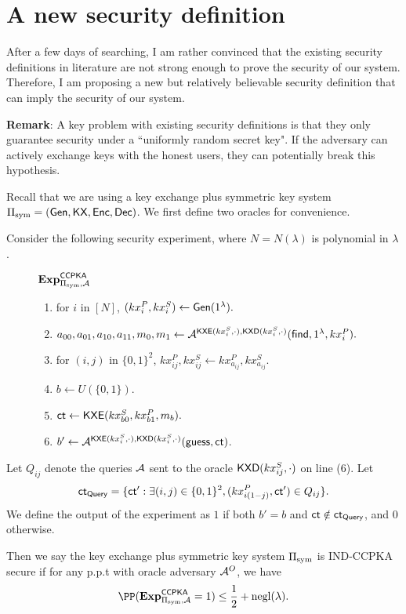 \clearpage
\section{A new security definition}
After a few days of searching, I am rather convinced that the existing security definitions in literature are not strong enough to prove the security of our system. Therefore, I am proposing a new but relatively believable security definition that can imply the security of our system.

\textbf{Remark}: A key problem with existing security definitions is that they only guarantee security under a ``uniformly random secret key". If the adversary can actively exchange keys with the honest users, they can potentially break this hypothesis.

Recall that we are using a key exchange plus symmetric key system $\Pi_{\text{sym}} = (\mathsf{Gen}, \mathsf{KX}, \mathsf{Enc}, \mathsf{Dec})$. We first define two oracles for convenience.

\begin{definition}
\label{defn:CCPKA}
Consider the following security experiment, where $N = N(\lambda)$ is polynomial in $\lambda$.
\begin{figure}[h!]
\begin{framed}
$\mathbf{Exp}^{\mathsf{CCPKA}}_{\Pi_{\text{sym}}, \mathcal{A}}$
\begin{enumerate}
    \item for $i$ in $[N]$, $(kx_{i}^P, kx_{i}^S) \leftarrow \mathsf{Gen}(1^{\lambda}).$
    \item $a_{00}, a_{01}, a_{10}, a_{11}, m_0, m_1 \leftarrow \mathcal{A}^{\mathsf{KXE}(kx_{i}^S, \cdot), \mathsf{KXD}(kx_{i}^S, \cdot)}(\mathsf{find}, 1^{\lambda}, kx_{i}^P).$
    \item for $(i, j)$ in $\{0, 1\}^2$, $kx^{P}_{ij}, kx^S_{ij} \leftarrow kx^P_{a_{ij}}, kx^S_{a_{ij}}$. 
    \item $b \leftarrow U(\{0, 1\})$.
    \item $\mathsf{ct} \leftarrow \mathsf{KXE}(kx_{b0}^S, kx_{b1}^P, m_b).$
    \item $b' \leftarrow \mathcal{A}^{\mathsf{KXE}(kx_{i}^S, \cdot), \mathsf{KXD}(kx_{i}^S, \cdot)}(\mathsf{guess}, \mathsf{ct})$.
\end{enumerate}
\end{framed}
\end{figure}

Let $Q_{ij}$ denote the queries $\mathcal{A}$ sent to the oracle $\mathsf{KXD}(kx_{ij}^S, \cdot)$ on line (6). Let
$$\mathsf{ct}_{\mathsf{Query}} = \{\mathsf{ct}': \exists (i,j) \in \{0, 1\}^2, (kx_{i(1 - j)}^P, \mathsf{ct}') \in Q_{ij}\}.$$
We define the output of the experiment as $1$ if both $b' = b$ and $\mathsf{ct} \notin \mathsf{ct}_{\mathsf{Query}}$, and $0$ otherwise. 

Then we say the key exchange plus symmetric key system $\Pi_{\text{sym}}$ is IND-CCPKA secure if for any p.p.t with oracle adversary $\mathcal{A}^O$, we have
$$\PP(\mathbf{Exp}^{\mathsf{CCPKA}}_{\Pi_{\sym}, \cA} = 1) \leq \frac{1}{2} + \negl(\lambda).$$
\end{definition}
